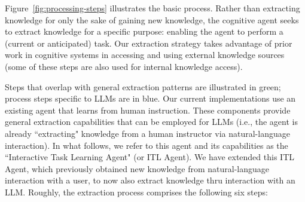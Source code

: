 \documentclass[letterpaper]{article} %
\begin{document}
Figure~\ref{fig:processing-steps} illustrates the basic process. Rather than extracting knowledge for only the sake of gaining new knowledge, the cognitive agent seeks to extract knowledge for a specific purpose: enabling the agent to perform a (current or anticipated) task. Our extraction strategy takes advantage of prior work in cognitive systems in accessing and using external knowledge sources (some of these steps are also used for internal knowledge access).

Steps that overlap with general extraction patterns are illustrated in green; process steps specific to LLMs are in blue. Our current implementations use an existing agent \cite{kirk_learning_2019,mininger_expanding_2021} that learns from human instruction. These components provide general extraction capabilities that can be employed for LLMs (i.e., the agent is already ``extracting" knowledge from a human instructor via natural-language interaction). In what follows, we refer to this agent and its capabilities as the ``Interactive Task Learning Agent" (or ITL Agent). We have extended this ITL Agent, which previously obtained new knowledge from natural-language interaction with a user, to now also extract knowledge thru interaction with an LLM. Roughly, the extraction process comprises the following six steps:
\end{document}
